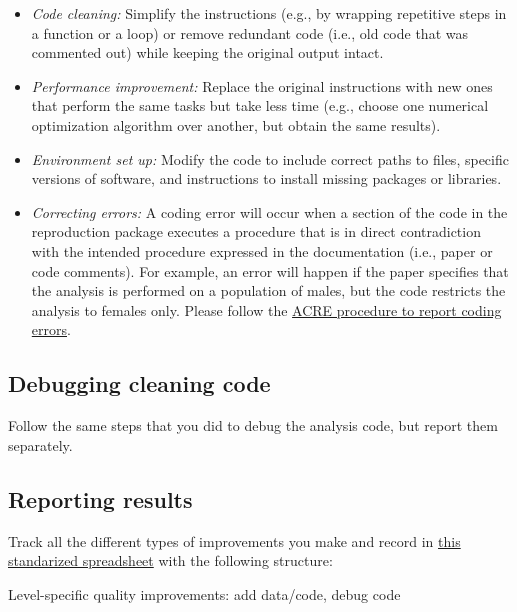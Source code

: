 \documentclass[]{book}
\providecommand{\tightlist}{%
  \setlength{\itemsep}{0pt}\setlength{\parskip}{0pt}}
\begin{document}
\begin{itemize}
\tightlist
\item
  \emph{Code cleaning:} Simplify the instructions (e.g., by wrapping repetitive steps in a function or a loop) or remove redundant code (i.e., old code that was commented out) while keeping the original output intact.\\
\item
  \emph{Performance improvement:} Replace the original instructions with new ones that perform the same tasks but take less time (e.g., choose one numerical optimization algorithm over another, but obtain the same results).\\
\item
  \emph{Environment set up:} Modify the code to include correct paths to files, specific versions of software, and instructions to install missing packages or libraries.\\
\item
  \emph{Correcting errors:} A coding error will occur when a section of the code in the reproduction package executes a procedure that is in direct contradiction with the intended procedure expressed in the documentation (i.e., paper or code comments). For example, an error will happen if the paper specifies that the analysis is performed on a population of males, but the code restricts the analysis to females only. Please follow the \href{ADD\%20LINK}{ACRE procedure to report coding errors}.
\end{itemize}

\hypertarget{debugging-cleaning-code}{%
\subsection{Debugging cleaning code}\label{debugging-cleaning-code}}

Follow the same steps that you did to debug the analysis code, but report them separately.

\hypertarget{reporting-results}{%
\subsection{Reporting results}\label{reporting-results}}

Track all the different types of improvements you make and record in \href{https://docs.google.com/spreadsheets/d/1LUIdVFH0OfR70C7z07TYeE-uWzKI_JIeWUMaYhqEKK0/edit\#gid=0\&range=A3}{this standarized spreadsheet} with the following structure:

\label{tab:improvements-spreadsheet}Level-specific quality improvements: add data/code, debug code
\end{document}
